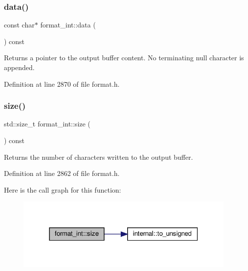 \subsubsection{\texorpdfstring{data()}{data()}}
{\footnotesize\ttfamily const char$\ast$ format\+\_\+int\+::data (\begin{DoxyParamCaption}{ }\end{DoxyParamCaption}) const\hspace{0.3cm}{\ttfamily [inline]}}

Returns a pointer to the output buffer content. No terminating null character is appended. 

Definition at line 2870 of file format.\+h.

\mbox{\label{classformat__int_a644fe6f2d0505d48ff08ab22448b5069}} 
\subsubsection{\texorpdfstring{size()}{size()}}
{\footnotesize\ttfamily std\+::size\+\_\+t format\+\_\+int\+::size (\begin{DoxyParamCaption}{ }\end{DoxyParamCaption}) const\hspace{0.3cm}{\ttfamily [inline]}}

Returns the number of characters written to the output buffer. 

Definition at line 2862 of file format.\+h.

Here is the call graph for this function\+:
\nopagebreak
\begin{figure}[H]
\begin{center}
\leavevmode
\includegraphics[width=307pt]{classformat__int_a644fe6f2d0505d48ff08ab22448b5069_cgraph}
\end{center}
\end{figure}
\mbox{\label{classformat__int_ab14204962423d35a320f15e673b08e06}} 

